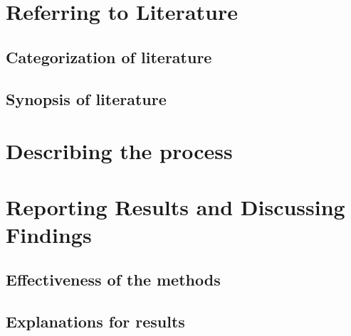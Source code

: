 \documentclass[11pt,onecolumn]{article}
\begin{document}
\section{Referring to Literature}

\subsection{Categorization of literature}


\subsection{Synopsis of literature}



\section{Describing the process}

\section{Reporting Results and Discussing Findings}

\subsection{Effectiveness of the methods}


\subsection{Explanations for results}




\end{document}
